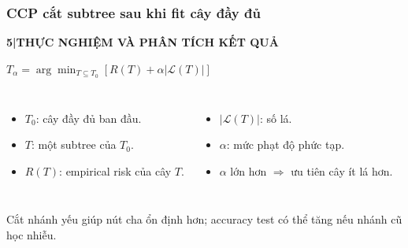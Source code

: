 \documentclass[aspectratio=169,12pt]{beamer}
\newcommand{\chaptertag}[2]{%
  \vspace{-0.16cm}%
  {\scriptsize\bfseries\textcolor{boxframe}{#1\enspace |\enspace #2}}\par
  \vspace{0.12cm}%
}
\begin{document}
\begin{frame}
  \frametitle{CCP cắt subtree sau khi fit cây đầy đủ}
  \chaptertag{5}{THỰC NGHIỆM VÀ PHÂN TÍCH KẾT QUẢ}
  \begin{tcolorbox}[focusbox,width=0.88\textwidth,top=3mm,bottom=3mm]
    \centering
    $\displaystyle T_{\alpha}=\arg\min_{T\subseteq T_0}
    \left[R(T)+\alpha|\mathcal{L}(T)|\right]$
  \end{tcolorbox}
  \vspace{0.16cm}
  \small
  \begin{columns}[T,onlytextwidth]
      \begin{itemize}
        \item $T_0$: cây đầy đủ ban đầu.
        \item $T$: một subtree của $T_0$.
        \item $R(T)$: empirical risk của cây $T$.
      \end{itemize}
      \begin{itemize}
        \item $|\mathcal{L}(T)|$: số lá.
        \item $\alpha$: mức phạt độ phức tạp.
        \item $\alpha$ lớn hơn $\Rightarrow$ ưu tiên cây ít lá hơn.
      \end{itemize}
  \end{columns}
  \vspace{0.04cm}
  \begin{tcolorbox}[focusbox,width=0.91\textwidth,top=1mm,bottom=1mm]
    \centering
    Cắt nhánh yếu giúp nút cha ổn định hơn; accuracy test có thể tăng nếu nhánh cũ học nhiễu.
  \end{tcolorbox}
\end{frame}
\end{document}
